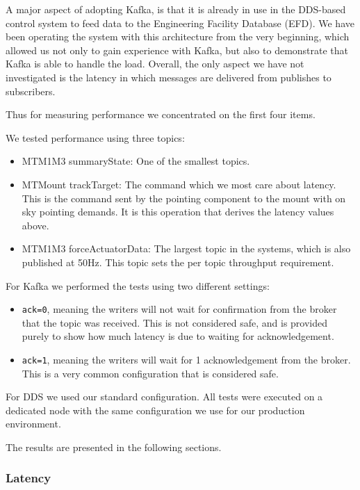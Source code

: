 \documentclass[]{spie}  %
\begin{document}
A major aspect of adopting Kafka, is that it is already in use in the DDS-based control system to feed data to the Engineering Facility Database (EFD).
We have been operating the system with this architecture from the very beginning, which allowed us not only to gain experience with Kafka, but also to demonstrate that Kafka is able to handle the load.
Overall, the only aspect we have not investigated is the latency in which messages are delivered from publishes to subscribers.

Thus for measuring performance we concentrated on the first four items.

We tested performance using three topics:

\begin{itemize}
  \item MTM1M3 summaryState: One of the smallest topics.
  \item MTMount trackTarget: The command which we most care about latency.
    This is the command sent by the pointing component to the mount with on sky pointing demands.
    It is this operation that derives the latency values above.
  \item MTM1M3 forceActuatorData: The largest topic in the systems, which is also published at 50Hz.
    This topic sets the per topic throughput requirement.
\end{itemize}

For Kafka we performed the tests using two different settings:

\begin{itemize}
  \item \texttt{ack=0}, meaning the writers will not wait for confirmation from the broker that the topic was received.
    This is not considered safe, and is provided purely to show how much latency is due to waiting for acknowledgement.
  \item \texttt{ack=1}, meaning the writers will wait for 1 acknowledgement from the broker.
    This is a very common configuration that is considered safe.
\end{itemize}

For DDS we used our standard configuration.
All tests were executed on a dedicated node with the same configuration we use for our production environment.

The results are presented in the following sections.

\subsubsection{Latency}
\label{subsubsec:performance:latency}
\end{document}
